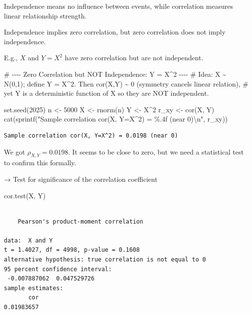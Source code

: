 \documentclass[
  12pt,
  letterpaper,
]{scrbook}
\newenvironment{Shaded}{\begin{snugshade}}{\end{snugshade}}
\newcommand{\CommentTok}[1]{\textcolor[rgb]{0.37,0.37,0.37}{#1}}
\newcommand{\DecValTok}[1]{\textcolor[rgb]{0.68,0.00,0.00}{#1}}
\newcommand{\FunctionTok}[1]{\textcolor[rgb]{0.28,0.35,0.67}{#1}}
\newcommand{\NormalTok}[1]{\textcolor[rgb]{0.00,0.23,0.31}{#1}}
\newcommand{\OtherTok}[1]{\textcolor[rgb]{0.00,0.23,0.31}{#1}}
\newcommand{\SpecialCharTok}[1]{\textcolor[rgb]{0.37,0.37,0.37}{#1}}
\newcommand{\StringTok}[1]{\textcolor[rgb]{0.13,0.47,0.30}{#1}}
\theoremstyle{plain}
\theoremstyle{definition}
\theoremstyle{remark}
\begin{document}
Independence means no influence between events, while correlation
measures linear relationship strength.

Independence implies zero correlation, but zero correlation does not
imply independence.

E.g., \(X\) and \(Y = X^2\) have zero correlation but are not
independent.

\begin{Shaded}
\begin{Highlighting}[]
\CommentTok{\# {-}{-}{-}{-} Zero Correlation but NOT Independence: Y = X\^{}2 {-}{-}{-}{-}}
\CommentTok{\# Idea: X \textasciitilde{} N(0,1); define Y = X\^{}2.  Then cor(X,Y) \textasciitilde{} 0 (symmetry cancels linear relation),}
\CommentTok{\# yet Y is a deterministic function of X so they are NOT independent.}

\FunctionTok{set.seed}\NormalTok{(}\DecValTok{2025}\NormalTok{)}
\NormalTok{n }\OtherTok{\textless{}{-}} \DecValTok{5000}
\NormalTok{X }\OtherTok{\textless{}{-}} \FunctionTok{rnorm}\NormalTok{(n)}
\NormalTok{Y }\OtherTok{\textless{}{-}}\NormalTok{ X}\SpecialCharTok{\^{}}\DecValTok{2}
\NormalTok{r\_xy }\OtherTok{\textless{}{-}} \FunctionTok{cor}\NormalTok{(X, Y)}
\FunctionTok{cat}\NormalTok{(}\FunctionTok{sprintf}\NormalTok{(}\StringTok{"Sample correlation cor(X, Y=X\^{}2) = \%.4f (near 0)}\SpecialCharTok{\textbackslash{}n}\StringTok{"}\NormalTok{, r\_xy))}
\end{Highlighting}
\end{Shaded}

\begin{verbatim}
Sample correlation cor(X, Y=X^2) = 0.0198 (near 0)
\end{verbatim}

We got \(\rho_{X,Y}=0.0198\). It seems to be close to zero, but we need
a statistical test to confirm this formally.

→ Test for significance of the correlation coefficient

\begin{Shaded}
\begin{Highlighting}[]
\FunctionTok{cor.test}\NormalTok{(X, Y)}
\end{Highlighting}
\end{Shaded}

\begin{verbatim}

    Pearson's product-moment correlation

data:  X and Y
t = 1.4027, df = 4998, p-value = 0.1608
alternative hypothesis: true correlation is not equal to 0
95 percent confidence interval:
 -0.007887062  0.047529726
sample estimates:
       cor 
0.01983657 
\end{verbatim}
\end{document}
